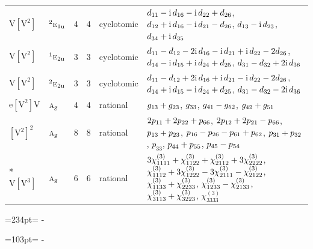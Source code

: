 \documentclass[10pt,a4paper]{article}
\newcommand{\needspace}[1]{\par\penalty-100\begingroup\dimen0=#1\relax\dimen2=\pagegoal
  \advance\dimen2-\pagetotal\ifdim\dimen0>\dimen2\relax\ifdim\dimen2>0pt\vfil\break\fi\fi
  \endgroup}
\numberwithin{equation}{section}
\newcommand{\irr}[1]{\text{\normalfont\scshape #1}}
\newcommand{\conjpair}[1]{{}^{#1}}
\newcommand{\ptag}[1]{\mathrm{#1}}
\newcommand{\iunit}{\mathrm{i}}
\newcommand{\jahn}[1]{\mathrm{#1}}
\newlength{\fillwidth}\newlength{\cellwidth}\newlength{\colwidth}
\newcommand{\signbreak}{\penalty100\relax}
\begin{document}
{\begin{longtable}{@{}llrrl>{\RaggedRight\arraybackslash}p{\fillwidth}@{}}
$\jahn{V[V^{2}]}$ & $\conjpair{2}\irr{e}_{1\ptag{u}}$ & 4 & 4 & cyclotomic & $d_{11} -\signbreak \iunit{}\,d_{16} -\signbreak \iunit{}\,d_{22} +\signbreak d_{26}$, $d_{12} +\signbreak \iunit{}\,d_{16} -\signbreak \iunit{}\,d_{21} -\signbreak d_{26}$, $d_{13} -\signbreak \iunit{}\,d_{23}$, $d_{34} +\signbreak \iunit{}\,d_{35}$\\
$\jahn{V[V^{2}]}$ & $\conjpair{1}\irr{e}_{2\ptag{u}}$ & 3 & 3 & cyclotomic & $d_{11} -\signbreak d_{12} -\signbreak 2\iunit{}\,d_{16} -\signbreak \iunit{}\,d_{21} +\signbreak \iunit{}\,d_{22} -\signbreak 2d_{26}$, $d_{14} -\signbreak \iunit{}\,d_{15} +\signbreak \iunit{}\,d_{24} +\signbreak d_{25}$, $d_{31} -\signbreak d_{32} +\signbreak 2\iunit{}\,d_{36}$\\
$\jahn{V[V^{2}]}$ & $\conjpair{2}\irr{e}_{2\ptag{u}}$ & 3 & 3 & cyclotomic & $d_{11} -\signbreak d_{12} +\signbreak 2\iunit{}\,d_{16} +\signbreak \iunit{}\,d_{21} -\signbreak \iunit{}\,d_{22} -\signbreak 2d_{26}$, $d_{14} +\signbreak \iunit{}\,d_{15} -\signbreak \iunit{}\,d_{24} +\signbreak d_{25}$, $d_{31} -\signbreak d_{32} -\signbreak 2\iunit{}\,d_{36}$\\
$\jahn{e[V^{2}]V}$ & $\irr{a}_{\ptag{g}}$ & 4 & 4 & rational & $\mathnormal{g}_{13} +\signbreak \mathnormal{g}_{23}$, $\mathnormal{g}_{33}$, $\mathnormal{g}_{41} -\signbreak \mathnormal{g}_{52}$, $\mathnormal{g}_{42} +\signbreak \mathnormal{g}_{51}$\\
$\jahn{[V^{2}]^{2}}$ & $\irr{a}_{\ptag{g}}$ & 8 & 8 & rational & $2p_{11} +\signbreak 2p_{22} +\signbreak p_{66}$, $2p_{12} +\signbreak 2p_{21} -\signbreak p_{66}$, $p_{13} +\signbreak p_{23}$, $p_{16} -\signbreak p_{26} -\signbreak p_{61} +\signbreak p_{62}$, $p_{31} +\signbreak p_{32}$, $p_{33}$, $p_{44} +\signbreak p_{55}$, $p_{45} -\signbreak p_{54}$\\*
$\jahn{V[V^{3}]}$ & $\irr{a}_{\ptag{g}}$ & 6 & 6 & rational & $3\chi^{(3)}_{1111} +\signbreak \chi^{(3)}_{1122} +\signbreak \chi^{(3)}_{2112} +\signbreak 3\chi^{(3)}_{2222}$, $\chi^{(3)}_{1112} +\signbreak 3\chi^{(3)}_{1222} -\signbreak 3\chi^{(3)}_{2111} -\signbreak \chi^{(3)}_{2122}$, $\chi^{(3)}_{1133} +\signbreak \chi^{(3)}_{2233}$, $\chi^{(3)}_{1233} -\signbreak \chi^{(3)}_{2133}$, $\chi^{(3)}_{3113} +\signbreak \chi^{(3)}_{3223}$, $\chi^{(3)}_{3333}$\\
\bottomrule\end{longtable}}
\needspace{234pt}
\needspace{103pt}
\end{document}
